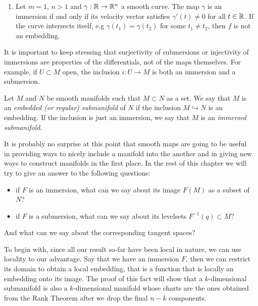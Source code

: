 \begin{example}
\begin{enumerate}
    \item Let $m=1$, $n > 1$ and $\gamma:\mathbb{R}\to\mathbb{R}^n$ a smooth curve.
          The map $\gamma$ is an immersion if and only if its velocity vector satisfies $\gamma'(t)\neq0$ for all $t\in\mathbb{R}$.
          If the curve intersects itself, e.g $\gamma(t_1) = \gamma(t_2)$ for some $t_1\neq t_2$, then $f$ is not an embedding.
  \end{enumerate}
\end{example}

\begin{remark}
  It is important to keep stressing that surjectivity of submersions or injectivity of immersions are properties of the differentials, not of the maps themselves.
  For example, if $U\subset M$ open, the inclusion $i: U \to M$ is both an immersion and a submersion.
\end{remark}

\begin{definition}
  Let $M$ and $N$ be smooth manifolds such that $M\subset N$ as a set.
  We say that $M$ is an \emph{embedded (or regular) submanifold} of $N$ if the inclusion $M\hookrightarrow N$ is an embedding. If the inclusion is just an immersion, we say that $M$ is an \emph{immersed submanifold}.
\end{definition}

It is probably no surprise at this point that smooth maps are going to be useful in providing ways to nicely include a manifold into the another and in giving new ways to construct manifolds in the first place.
In the rest of this chapter we will try to give an answer to the following questions:
\begin{itemize}
  \item if $F$ is an immersion, what can we say about its image $F(M)$ as a subset of $N$?
  \item if $F$ is a submersion, what can we say about its levelsets $F^{-1}(q) \subset M$?
\end{itemize}
And what can we say about the corresponding tangent spaces?


To begin with, since all our result so-far have been local in nature, we can use locality to our advantage.
Say that we have an immersion $F$, then we can restrict its domain to obtain a local embedding, that is
a function that is locally an embedding onto its image.
The proof of this fact will show that a $k$-dimensional submanifold is also a $k$-dimensional manifold
whose charts are the ones obtained from the Rank Theorem after we drop the final $n-k$ components.


